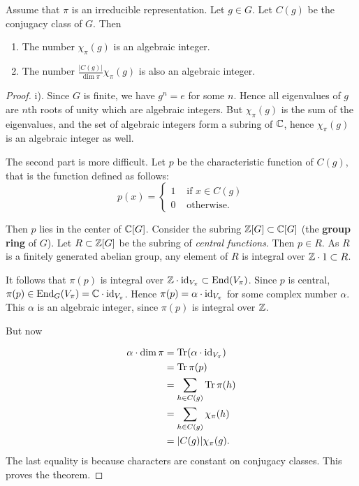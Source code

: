 \documentclass[11pt, english]{article}
\begin{document}
\begin{prop}
 Assume that $\pi$ is an irreducible representation. Let $g \in G$. Let $C(g)$ be the conjugacy class of $G$. Then
 \begin{enumerate}
 \item The number $\chi_\pi(g)$ is an algebraic integer.
\item The number $\frac{\lvert C(g) \rvert}{\dim \pi} \chi_\pi(g)$ is also an algebraic integer.
 \end{enumerate}
\end{prop}
\begin{proof}
i). Since $G$ is finite, we have $g^n=e$ for some $n$. Hence all eigenvalues of $g$ are $n$th roots of unity which are algebraic integers. But $\chi_\pi(g)$ is the sum of the eigenvalues, and the set of algebraic integers form a subring of $\mathbb{C}$, hence $\chi_\pi(g)$ is an algebraic integer as well.

The second part is more difficult. Let $p$ be the characteristic function of $C(g)$, that is the function defined as follows:
$$
p(x) = \begin{cases} 1 & \text{ if $x \in C(g)$} \\
0 & \text{ otherwise}.
\end{cases}
$$

Then $p$ lies in the center of $\mathbb{C}[G]$. Consider the subring $\mathbb{Z}[G] \subset \mathbb{C}[G]$ (the \textbf{group ring} of $G$). Let $R \subset \mathbb{Z}[G]$ be the subring of \emph{central functions}. Then $p \in R$. As $R$ is a finitely generated abelian group, any element of $R$ is integral over $\mathbb{Z} \cdot 1 \subset R$. 

It follows that $\pi(p)$ is integral over $\mathbb{Z} \cdot \text{id}_{V_\pi} \subset \operatorname{End}(V_\pi)$. Since $p$ is central, $\pi(p) \in \operatorname{End}_G(V_\pi)=\mathbb{C} \cdot \text{id}_{V_\pi}$. Hence $\pi(p) = \alpha \cdot \text{id}_{V_\pi}$ for some complex number $\alpha$. This $\alpha$ is an algebraic integer, since $\pi(p)$ is integral over $\mathbb{Z}$.

But now

\begin{align*}
  \alpha \cdot \dim \pi &= \operatorname{Tr}( \alpha \cdot \text{id}_{V_\pi}) \\
&= \operatorname{Tr} \pi(p) \\
&= \sum_{h \in C(g)} \operatorname{Tr} \pi(h) \\
&= \sum_{h \in C(g)} \chi_\pi(h) \\
&= \lvert C(g) \rvert \chi_\pi(g).
\end{align*}
The last equality is because characters are constant on conjugacy classes. This proves the theorem.
\end{proof}
\end{document}
